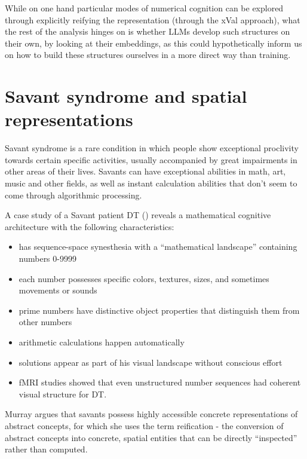 \documentclass[
  a4paper, twoside, 10pt, titlepage]{book}
\providecommand{\tightlist}{%
  \setlength{\itemsep}{0pt}\setlength{\parskip}{0pt}}
\begin{document}
While on one hand particular modes of numerical cognition can be
explored through explicitly reifying the representation (through the
xVal approach), what the rest of the analysis hinges on is whether LLMs
develop such structures on their own, by looking at their embeddings, as
this could hypothetically inform us on how to build these structures
ourselves in a more direct way than training.

\section{Savant syndrome and spatial
representations}\label{savant-syndrome-and-spatial-representations}

Savant syndrome is a rare condition in which people show exceptional
proclivity towards certain specific activities, usually accompanied by
great impairments in other areas of their lives. Savants can have
exceptional abilities in math, art, music and other fields, as well as
instant calculation abilities that don't seem to come through
algorithmic processing.

A case study of a Savant patient DT () reveals a mathematical cognitive architecture with the following
characteristics:

\begin{itemize}
\tightlist
\item
  has sequence-space synesthesia with a ``mathematical landscape''
  containing numbers 0-9999
\item
  each number possesses specific colors, textures, sizes, and sometimes
  movements or sounds
\item
  prime numbers have distinctive object properties that distinguish them
  from other numbers
\item
  arithmetic calculations happen automatically
\item
  solutions appear as part of his visual landscape without conscious
  effort
\item
  fMRI studies showed that even unstructured number sequences had
  coherent visual structure for DT.
\end{itemize}

Murray argues that savants possess highly accessible concrete
representations of abstract concepts, for which she uses the term
reification - the conversion of abstract concepts into concrete, spatial
entities that can be directly ``inspected'' rather than computed.
\end{document}
